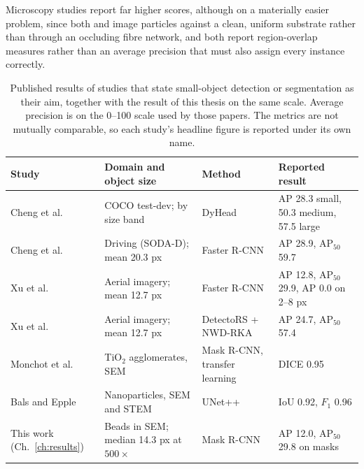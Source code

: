 Microscopy studies report far higher scores, although on a materially easier
problem, since both \cite{monchot2021titanium} and \cite{bals2023nanoparticles}
image particles against a clean, uniform substrate rather than through an
occluding fibre network, and both report region-overlap measures rather than an
average precision that must also assign every instance correctly.

\begin{table}[htbp]
    \centering
    \caption{Published results of studies that state small-object detection or
    segmentation as their aim, together with the result of this thesis on the same
    scale. Average precision is on the 0--100 scale used by those papers. The
    metrics are not mutually comparable, so each study's headline figure is
    reported under its own name.}
    \label{tab:small_object_lit}
    \begin{tabular}{p{3.0cm}p{2.9cm}p{2.4cm}p{3.2cm}}
        \toprule
        Study & Domain and object size & Method & Reported result \\
        \midrule
        Cheng et al. \cite{cheng2023soda} &
        COCO test-dev; by size band &
        DyHead &
        AP 28.3 small, 50.3 medium, 57.5 large \\
        \addlinespace
        Cheng et al. \cite{cheng2023soda} &
        Driving (SODA-D); mean 20.3 px &
        Faster R-CNN &
        AP 28.9, AP$_{50}$ 59.7 \\
        \addlinespace
        Xu et al. \cite{xu2022tiny} &
        Aerial imagery; mean 12.7 px &
        Faster R-CNN &
        AP 12.8, AP$_{50}$ 29.9, AP 0.0 on 2--8 px \\
        \addlinespace
        Xu et al. \cite{xu2022tiny} &
        Aerial imagery; mean 12.7 px &
        DetectoRS + NWD-RKA &
        AP 24.7, AP$_{50}$ 57.4 \\
        \addlinespace
        Monchot et al. \cite{monchot2021titanium} &
        TiO$_2$ agglomerates, SEM &
        Mask R-CNN, transfer learning &
        DICE 0.95 \\
        \addlinespace
        Bals and Epple \cite{bals2023nanoparticles} &
        Nanoparticles, SEM and STEM &
        UNet++ &
        IoU 0.92, $F_1$ 0.96 \\
        \addlinespace
        This work (Ch.~\ref{ch:results}) &
        Beads in SEM; median 14.3 px at $500\times$ &
        Mask R-CNN &
        AP 12.0, AP$_{50}$ 29.8 on masks \\
        \bottomrule
    \end{tabular}
\end{table}

